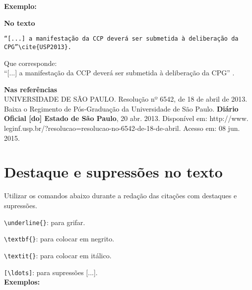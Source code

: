 \textbf{Exemplo:}

\begin{alineas}
\item
\textbf{No texto}
\begin{verbatim}
“[...] a manifestação da CCP deverá ser submetida à deliberação da
CPG”\cite{USP2013}.
\end{verbatim}
Que corresponde:\\
“[...] a manifestação da CCP deverá ser submetida à deliberação da
CPG” \cite{USP2013}. \\

\item 
\textbf{Nas referências}\\

UNIVERSIDADE DE SÃO PAULO. Resolução nº 6542, de 18 de abril de 2013.
Baixa o Regimento de Pós-Graduação da Universidade de São Paulo. \textbf{Diário
Oficial [do] Estado de São Paulo}, 20 abr. 2013. Disponível em: http://www.
leginf.usp.br/?resolucao=resolucao-no-6542-de-18-de-abril. Acesso em: 08 jun.
2015.
\end{alineas}

\section{Destaque e supressões no texto}

Utilizar os comandos abaixo durante a redação das citações com destaques e supressões.

\verb+\underline{}+: para grifar.

\verb+\textbf{}+: para colocar em negrito.

\verb+\textit{}+: para colocar em itálico.

\verb+[\ldots]+: para supressões [...]. \\

\textbf{Exemplos:}

